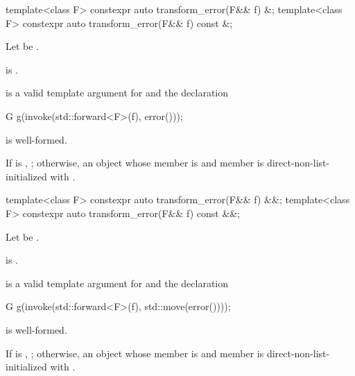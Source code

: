 %
\begin{itemdecl}
template<class F> constexpr auto transform_error(F&& f) &;
template<class F> constexpr auto transform_error(F&& f) const &;
\end{itemdecl}

\begin{itemdescr}
\pnum
Let  be .

\pnum
\constraints
{} is .

\pnum
\mandates
{} is a valid template argument
for  and the declaration
\begin{codeblock}
G g(invoke(std::forward<F>(f), error()));
\end{codeblock}
is well-formed.

\pnum
\returns
If  is ,
; otherwise, an 
object whose  member is  and  member
is direct-non-list-initialized with .
\end{itemdescr}

%
\begin{itemdecl}
template<class F> constexpr auto transform_error(F&& f) &&;
template<class F> constexpr auto transform_error(F&& f) const &&;
\end{itemdecl}

\begin{itemdescr}
\pnum
Let  be
.

\pnum
\constraints
{} is .

\pnum
\mandates
{} is a valid template argument
for  and the declaration
\begin{codeblock}
G g(invoke(std::forward<F>(f), std::move(error())));
\end{codeblock}
is well-formed.

\pnum
\returns
If  is ,
; otherwise, an
 object whose  member is 
and  member is direct-non-list-initialized with
.
\end{itemdescr}

